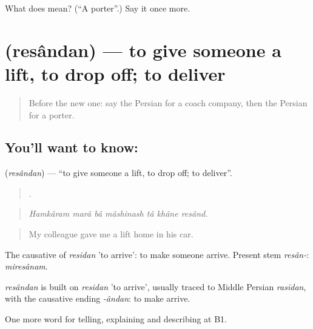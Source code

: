 \begin{tcolorbox}[breakable,colback=teal!4,colframe=teal!35!black,title={Before you move on}]
What does  mean? (\textquotedblleft{}A porter\textquotedblright{}.) Say it once more.
\end{tcolorbox}
\section[\texorpdfstring{\fa{رساندن} (resândan)}{رساندن (resândan)}]{ (resândan) — to give someone a lift, to drop off; to deliver}

\label{lesson:FA-C435-resandan}



\begin{quote}
Before the new one: say the Persian for a coach company, then the Persian for a porter.
\end{quote}

\subsection*{You'll want to know: }
\textbf{} (\emph{resândan}) — \textquotedblleft{}to give someone a lift, to drop off; to deliver\textquotedblright{}.

\begin{quote}
      .
\end{quote}

\begin{quote}
\emph{Hamkâram marâ bâ mâshinash tâ khâne resând.}
\end{quote}

\begin{quote}
My colleague gave me a lift home in his car.
\end{quote}

The causative of \emph{residan} 'to arrive': to make someone arrive. Present stem \emph{resân-}: \emph{miresânam}.

\begin{cousinweb}
\emph{resândan} is built on \emph{residan} 'to arrive', usually traced to Middle Persian \emph{rasīdan}, with the causative ending \emph{-ândan}: to make arrive.
\end{cousinweb}

\begin{grammarlens}[title={What you've built}]
One more word for telling, explaining and describing at B1.
\end{grammarlens}

